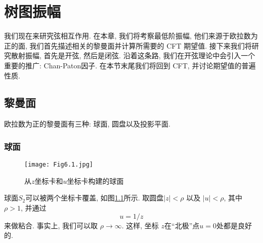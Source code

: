 
\chapter{树图振幅} \label{cha:6}
我们现在来研究弦相互作用. 在本章, 我们将考察最低阶振幅, 他们来源于欧拉数为正的面, 我们首先描述相关的黎曼面并计算所需要的 CFT 期望值.
接下来我们将研究散射振幅, 首先是开弦, 然后是闭弦. 沿着这条路, 我们在开弦理论中会引入一个重要的推广: Chan-Paton因子. 
在本节末尾我们将回到 CFT, 并讨论期望值的普遍性质.

\section{黎曼面} \label{sec:6.1}

欧拉数为正的黎曼面有三种: 球面, 圆盘以及投影平面.

\subsection*{球面}

\begin{figure}
	\begin{center}
		\texttt{[image: Fig6.1.jpg]}\\
		\caption{从$z$坐标卡和$u$坐标卡构建的球面}\label{fig:6.1}
	\end{center}
\end{figure}

球面$S_2$可以被两个坐标卡覆盖, 如图\ref{fig:6.1}所示. 取圆盘$|z|<\rho$ 以及 $|u|<\rho$, 其中 $\rho>1$, 
并通过 
\begin{equation}
u=1 / z  \label{6.1.1}
\end{equation}
来做粘合. 事实上, 我们可以取 $\rho \to \infty$. 这样, 坐标 $z$在``北极''点$u=0$处都是良好的. 

